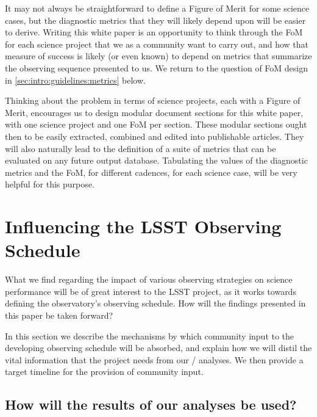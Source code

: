 It may not always be straightforward to define a Figure of
Merit for some science cases, but the diagnostic metrics that they will likely depend
upon will be easier to derive. Writing this white paper is an
opportunity to think through the FoM for each science
project that we as a community want to carry out, and how that measure
of success is likely (or even known) to depend on metrics that
summarize the observing sequence presented to us. We return to the
question of FoM design in \autoref{sec:intro:guidelines:metrics} below.

Thinking about the problem in terms of science projects, each with a
Figure of Merit, encourages us to design modular document sections
for this white paper, with
one science project and one FoM per section. These modular
sections ought then to be easily extracted, combined and edited into
publishable articles. They will also naturally lead to the definition of
a suite of \MAF metrics that can be evaluated on any future \OpSim output
database.  Tabulating the values of the diagnostic metrics and the FoM,
for different cadences, for each science case, will be very helpful for
this purpose.

\navigationbar


\section{Influencing the LSST Observing Schedule}
\def\secname{intro:schedule}\label{sec:\secname}

What we find regarding the impact of various observing strategies on
science performance will be of great interest to the LSST project, as it
works towards defining the observatory's observing schedule. How will
the findings presented in this paper be taken forward?

In this section we describe the mechanisms by which community input to
the developing observing schedule will be absorbed, and explain how
we will distil the vital information that the project needs from our
\OpSim / \MAF analyses. We then provide a target timeline for the provision of community input.


\subsection{How will the results of our analyses be used?}
\label{sec:\secname:useage}

